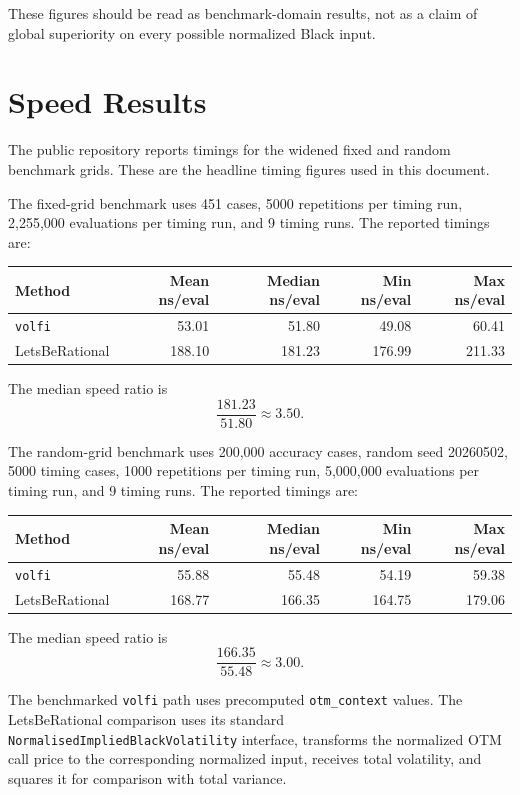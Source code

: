 \documentclass[11pt]{article}
\begin{document}
	These figures should be read as benchmark-domain results, not as a claim of global superiority on every possible normalized Black input.
	
	\section{Speed Results}
	
	The public repository reports timings for the widened fixed and random benchmark grids. These are the headline timing figures used in this document.
	
	The fixed-grid benchmark uses 451 cases, 5000 repetitions per timing run, 2,255,000 evaluations per timing run, and 9 timing runs. The reported timings are:
	\begin{center}
		\begin{tabular}{lrrrr}
			\toprule
			Method & Mean ns/eval & Median ns/eval & Min ns/eval & Max ns/eval \\
			\midrule
			\texttt{volfi} & 53.01 & 51.80 & 49.08 & 60.41 \\
			LetsBeRational & 188.10 & 181.23 & 176.99 & 211.33 \\
			\bottomrule
		\end{tabular}
	\end{center}
	The median speed ratio is
	\begin{equation}
		\frac{181.23}{51.80}\approx 3.50.
	\end{equation}
	
	The random-grid benchmark uses 200,000 accuracy cases, random seed 20260502, 5000 timing cases, 1000 repetitions per timing run, 5,000,000 evaluations per timing run, and 9 timing runs. The reported timings are:
	\begin{center}
		\begin{tabular}{lrrrr}
			\toprule
			Method & Mean ns/eval & Median ns/eval & Min ns/eval & Max ns/eval \\
			\midrule
			\texttt{volfi} & 55.88 & 55.48 & 54.19 & 59.38 \\
			LetsBeRational & 168.77 & 166.35 & 164.75 & 179.06 \\
			\bottomrule
		\end{tabular}
	\end{center}
	The median speed ratio is
	\begin{equation}
		\frac{166.35}{55.48}\approx 3.00.
	\end{equation}
	
	The benchmarked \texttt{volfi} path uses precomputed \texttt{otm\_context} values. The LetsBeRational comparison uses its standard \texttt{NormalisedImpliedBlackVolatility} interface, transforms the normalized OTM call price to the corresponding normalized input, receives total volatility, and squares it for comparison with total variance.
	
\end{document}
